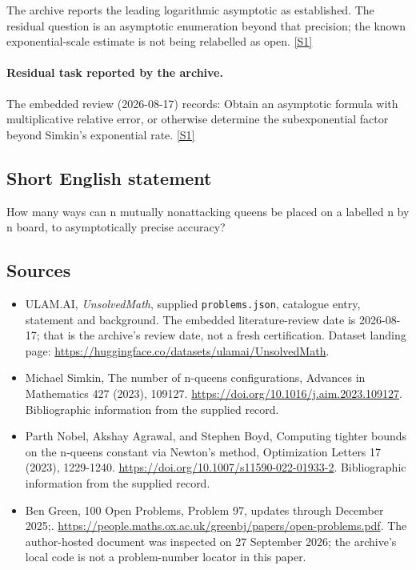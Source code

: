 \documentclass[11pt,a4paper]{article}
\newcommand{\sref}[2]{\hyperlink{source:#1:#2}{[S#2]}}
\begin{document}
The archive reports the leading logarithmic asymptotic as established. The residual question is an asymptotic enumeration beyond that precision; the known exponential-scale estimate is not being relabelled as open. \sref{statement}{1}

\paragraph{Residual task reported by the archive.}

The embedded review (2026-08-17) records: Obtain an asymptotic formula with multiplicative relative error, or otherwise determine the subexponential factor beyond Simkin's exponential rate. \sref{statement}{1}

\subsection{Short English statement}

How many ways can n mutually nonattacking queens be placed on a labelled n by n board, to asymptotically precise accuracy?

\subsection{Sources}

{\small

\begin{itemize}

\item[\hypertarget{source:statement:1}{S1}] ULAM.AI, \emph{UnsolvedMath}, supplied \texttt{problems.json}, catalogue entry, statement and background. The embedded literature-review date is 2026-08-17; that is the archive’s review date, not a fresh certification. Dataset landing page: \url{https://huggingface.co/datasets/ulamai/UnsolvedMath}.

\item[\hypertarget{source:statement:2}{S2}] Michael Simkin, The number of n-queens configurations, Advances in Mathematics 427 (2023), 109127. \url{https://doi.org/10.1016/j.aim.2023.109127}. Bibliographic information from the supplied record.

\item[\hypertarget{source:statement:3}{S3}] Parth Nobel, Akshay Agrawal, and Stephen Boyd, Computing tighter bounds on the n-queens constant via Newton's method, Optimization Letters 17 (2023), 1229-1240. \url{https://doi.org/10.1007/s11590-022-01933-2}. Bibliographic information from the supplied record.

\item[\hypertarget{source:statement:4}{S4}] Ben Green, 100 Open Problems, Problem 97, updates through December 2025;. \url{https://people.maths.ox.ac.uk/greenbj/papers/open-problems.pdf}. The author-hosted document was inspected on 27 September 2026; the archive’s local code is not a problem-number locator in this paper.

\end{itemize}

}

\label{end:statement}
\end{document}
